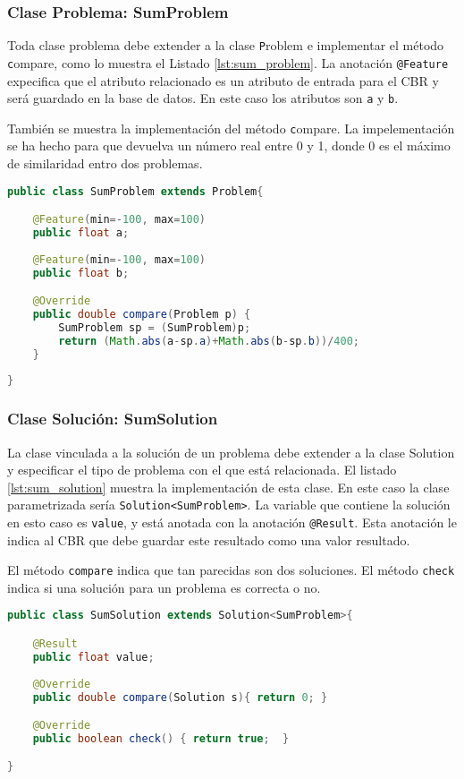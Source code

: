 \documentclass[11pt]{article}
\begin{document}
\subsubsection{Clase Problema: SumProblem}

Toda clase problema debe extender a la clase {\texttt Problem} e implementar el método {\texttt compare}, como lo muestra el Listado \ref{lst:sum_problem}. La anotación \texttt{@Feature} expecifica que el atributo relacionado es un atributo de entrada para el CBR y será guardado en la base de datos. En este caso los atributos son \texttt{a} y \texttt{b}.


También se muestra la implementación del método {\texttt compare}. La impelementación se ha hecho para que devuelva un número real entre 0 y 1, donde 0 es el máximo de similaridad entro dos problemas. 


\begin{lstlisting}[language=Java, caption=Clase SumProblem, label={lst:sum_problem}]
public class SumProblem extends Problem{

	@Feature(min=-100, max=100)
	public float a;
	
	@Feature(min=-100, max=100)
	public float b;

	@Override
	public double compare(Problem p) {
		SumProblem sp = (SumProblem)p;
		return (Math.abs(a-sp.a)+Math.abs(b-sp.b))/400;
	}
	
}
\end{lstlisting}

\subsubsection{Clase Solución: SumSolution}

La clase vinculada a la solución de un problema debe extender a la clase Solution y especificar el tipo de problema con el que está relacionada. El listado \ref{lst:sum_solution} muestra la implementación de esta clase. En este caso la clase parametrizada sería \texttt{Solution<SumProblem>}. La variable que contiene la solución en esto caso es \texttt{value}, y está anotada con la anotación \texttt{@Result}. Esta anotación le indica al CBR que debe guardar este resultado como una valor resultado.

El método \texttt{compare} indica que tan parecidas son dos soluciones. El método \texttt{check} indica si una solución para un problema es correcta o no.

\begin{lstlisting}[language=Java, caption=Clase SumSolution, label={lst:sum_solution}]
public class SumSolution extends Solution<SumProblem>{

	@Result
	public float value;
	
	@Override
	public double compare(Solution s){ return 0; }

	@Override
	public boolean check() { return true;  }

}
\end{lstlisting}
\end{document}
